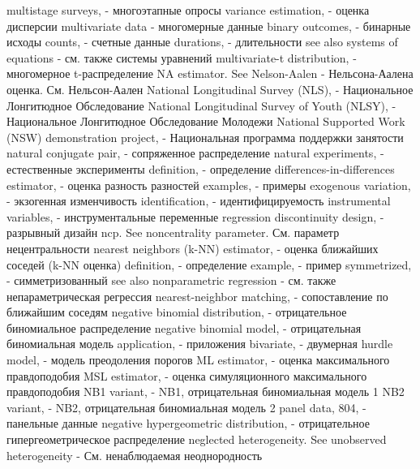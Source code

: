 multistage surveys, - многоэтапные опросы 
variance estimation, - оценка дисперсии
multivariate data - многомерные данные
binary outcomes, - бинарные исходы
counts, - счетные данные
durations, - длительности
see also systems of equations - см. также системы уравнений
multivariate-t distribution, - многомерное t-распределение
NA estimator. See Nelson-Aalen - Нельсона-Аалена оценка. См. Нельсон-Аален
National Longitudinal Survey (NLS), - Национальное Лонгитюдное Обследование
National Longitudinal Survey of Youth (NLSY), - Национальное Лонгитюдное Обследование Молодежи
National Supported Work (NSW) demonstration project, - Национальная программа поддержки занятости
natural conjugate pair, - сопряженное распределение
natural experiments, - естественные эксперименты
definition, - определение
differences-in-differences estimator, - оценка разность разностей
examples, - примеры
exogenous variation, - экзогенная изменчивость
identification, - идентифицируемость
instrumental variables, - инструментальные переменные
regression discontinuity design, - разрывный дизайн
ncp. See noncentrality parameter. См. параметр нецентральности
nearest neighbors (k-NN) estimator, - оценка ближайших соседей (k-NN оценка)
definition, - определение
example, - пример
symmetrized, - симметризованный
see also nonparametric regression - см. также непараметрическая регрессия
nearest-neighbor matching, - сопоставление по ближайшим соседям
negative binomial distribution, - отрицательное биномиальное распределение
negative binomial model, - отрицательная биномиальная модель
application, - приложения
bivariate, - двумерная
hurdle model, - модель преодоления порогов
ML estimator, - оценка максимального правдоподобия
MSL estimator, - оценка симуляционного максимального правдоподобия
NB1 variant, - NB1, отрицательная биномиальная модель 1
NB2 variant, - NB2, отрицательная биномиальная модель 2
panel data, 804, - панельные данные
negative hypergeometric distribution, - отрицательное гипергеометрическое распределение
neglected heterogeneity. See unobserved heterogeneity - См. ненаблюдаемая неоднородность

